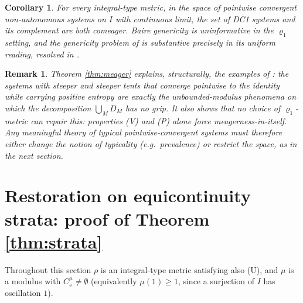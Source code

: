﻿\documentclass[11pt]{article}
\newtheorem{corollary}[theorem]{Corollary}
\newtheorem{remark}[theorem]{Remark}
\newcommand{\I}{I}
\begin{document}
\begin{corollary}\label{cor:trivial}
For every integral-type metric, in the space of pointwise convergent
non-autonomous systems on $\I$ with continuous limit, the set of DC1 systems and
its complement are both comeager.  Baire genericity is uninformative in the
$\varrho_1$ setting, and the genericity problem of \cite{BR} is substantive
precisely in its uniform reading, resolved in \cite{companion}.
\end{corollary}

\begin{remark}
Theorem \ref{thm:meager} explains, structurally, the examples of
\cite[Section 3]{BR}: the systems with steeper and steeper tents that converge
pointwise to the identity while carrying positive entropy are exactly the
unbounded-modulus phenomena on which the decomposition $\bigcup_MD_M$ has no
grip.  It also shows that no choice of $\varrho_1$-metric can repair this:
properties (V) and (P) alone force meagerness-in-itself.  Any meaningful theory of
typical pointwise-convergent systems must therefore either change the notion of
typicality (e.g.\ prevalence) or restrict the space, as in the next section.
\end{remark}

\section{Restoration on equicontinuity strata: proof of Theorem \ref{thm:strata}}
\label{sec:strata}

Throughout this section $\rho$ is an integral-type metric satisfying also (U),
and $\mu$ is a modulus with $C^\mu_s\ne\emptyset$ (equivalently $\mu(1)\ge1$,
since a surjection of $\I$ has oscillation $1$).
\end{document}
